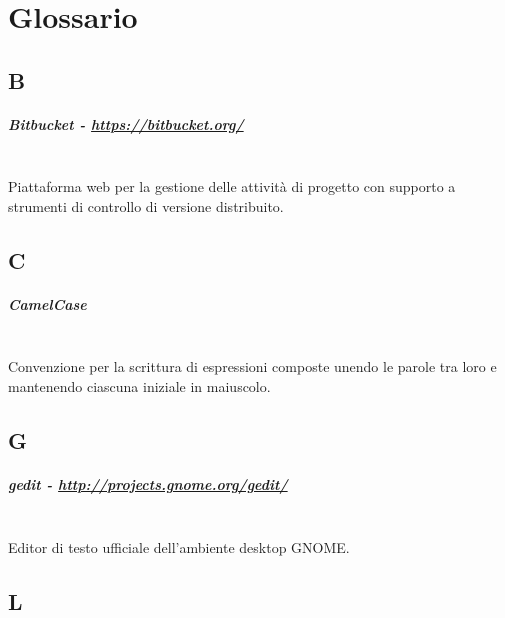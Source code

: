 \chapter{Glossario}
\label{ch:tesi:appendice:glossario}

\section*{B}
\paragraph{Bitbucket - \url{https://bitbucket.org/}} \hfill \\
Piattaforma web per la gestione delle attività di progetto con supporto a strumenti di controllo di versione distribuito.

\section*{C}
\paragraph{CamelCase} \hfill \\
Convenzione per la scrittura di espressioni composte unendo le parole tra loro e mantenendo ciascuna iniziale in maiuscolo.

\section*{G}
\paragraph{gedit - \url{http://projects.gnome.org/gedit/}} \hfill \\
Editor di testo ufficiale dell'ambiente desktop GNOME.

\section*{L}
